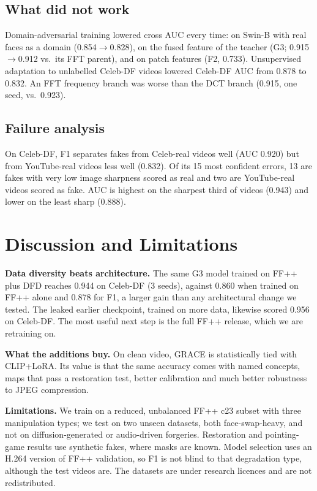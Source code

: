 \documentclass[conference]{IEEEtran}
\begin{document}
\subsection{What did not work}
Domain-adversarial training lowered cross AUC every time: on Swin-B with real faces as a domain (0.854$\to$0.828),
on the fused feature of the teacher (G3; 0.915$\to$0.912 vs.\ its FFT parent), and on patch features (F2, 0.733).
Unsupervised adaptation to unlabelled Celeb-DF videos lowered Celeb-DF AUC from 0.878 to 0.832. An FFT frequency
branch was worse than the DCT branch (0.915, one seed, vs.\ 0.923).

\subsection{Failure analysis}
On Celeb-DF, F1 separates fakes from Celeb-real videos well (AUC 0.920) but from YouTube-real videos less well
(0.832). Of its 15 most confident errors, 13 are fakes with very low image sharpness scored as real and two are
YouTube-real videos scored as fake. AUC is highest on the sharpest third of videos (0.943) and lower on the least sharp (0.888).

\section{Discussion and Limitations}\label{sec:disc}

\textbf{Data diversity beats architecture.} The same G3 model trained on FF++ plus DFD reaches 0.944 on Celeb-DF
(3 seeds), against 0.860 when trained on FF++ alone and 0.878 for F1, a larger gain than any architectural change we
tested. The leaked earlier checkpoint, trained on more data, likewise scored 0.956 on Celeb-DF. The most useful next
step is the full FF++ release, which we are retraining on.

\textbf{What the additions buy.} On clean video, GRACE is statistically tied with CLIP+LoRA. Its value is that the
same accuracy comes with named concepts, maps that pass a restoration test, better calibration and much better
robustness to JPEG compression.

\textbf{Limitations.} We train on a reduced, unbalanced FF++ c23 subset with three manipulation types; we test on
two unseen datasets, both face-swap-heavy, and not on diffusion-generated or audio-driven forgeries. Restoration and
pointing-game results use synthetic fakes, where masks are known. Model selection uses an H.264 version of FF++
validation, so F1 is not blind to that degradation type, although the test videos are. The datasets are under
research licences and are not redistributed.
\end{document}
